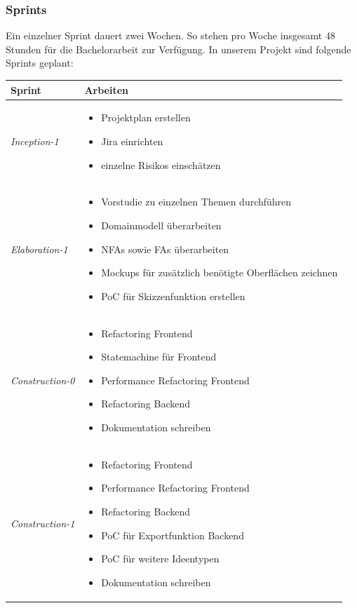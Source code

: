\subsubsection*{Sprints}
Ein einzelner Sprint dauert zwei Wochen. So stehen pro Woche insgesamt 48 Stunden für die Bachelorarbeit zur Verfügung. In unserem Projekt sind folgende Sprints geplant:

\begin{center}
	\begin{longtable}{| l | p{10cm} |}
		\hline
		\textbf{Sprint} & \textbf{Arbeiten}\\
		\hline
		\textit{Inception-1 } & 
			\begin{itemize}[noitemsep]
				\item Projektplan erstellen
				\item Jira einrichten
				\item einzelne Risikos einschätzen
			\end{itemize}\\
		\hline
		\textit{Elaboration-1 } & 
			\begin{itemize}[noitemsep]
				\item Vorstudie zu einzelnen Themen durchführen
				\item Domainmodell überarbeiten
				\item NFAs sowie FAs überarbeiten
				\item Mockups für zusätzlich benötigte Oberflächen zeichnen
				\item PoC für Skizzenfunktion erstellen
			\end{itemize}\\
		\hline
		\textit{Construction-0 } & 
			\begin{itemize}[noitemsep]
				\item Refactoring Frontend
				\item Statemachine für Frontend
				\item Performance Refactoring Frontend
				\item Refactoring Backend
				\item Dokumentation schreiben
			\end{itemize}\\
		\hline
		\textit{Construction-1 } & 
			\begin{itemize}[noitemsep]
				\item Refactoring Frontend
				\item Performance Refactoring Frontend
				\item Refactoring Backend
				\item PoC für Exportfunktion Backend
				\item PoC für weitere Ideentypen
				\item Dokumentation schreiben
			\end{itemize}\\
		\hline
	\end{longtable}
\end{center}

